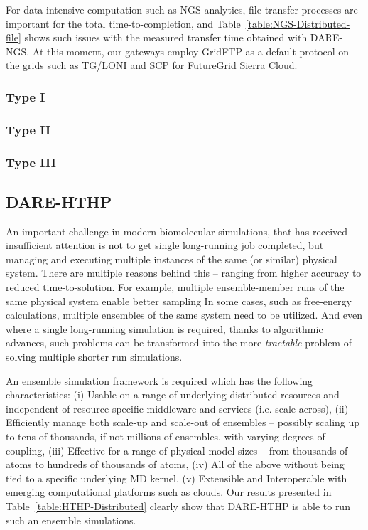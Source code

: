 \documentclass[]{article}
\begin{document}
For data-intensive computation such as NGS analytics, file transfer
processes are important for the total time-to-completion, and
Table~\ref{table:NGS-Distributed-file} shows such issues with the
measured transfer time obtained with DARE-NGS.  At this moment, our
gateways employ GridFTP as a default protocol on the grids such as
TG/LONI and SCP for FutureGrid Sierra Cloud.


\subsubsection{Type I} 

\subsubsection{Type II} 

\subsubsection{Type III} 


\subsection{DARE-HTHP}

An important challenge in modern biomolecular simulations, that has
received insufficient attention is not to get single long-running job
completed, but managing and executing multiple instances of the same
(or similar) physical system.  There are multiple reasons behind this
-- ranging from higher accuracy to reduced time-to-solution. For
example, multiple ensemble-member runs of the same physical system
enable better sampling In some cases, such as free-energy
calculations, multiple ensembles of the same system need to be
utilized. And even where a single long-running simulation is required,
thanks to algorithmic advances, such problems can be transformed into
the more {\it tractable} problem of solving multiple shorter run
simulations.



An ensemble simulation framework is required which has the following
characteristics: (i) Usable on a range of underlying distributed
resources and independent of resource-specific
middleware and services (i.e. scale-across), (ii) Efficiently manage
both scale-up and scale-out of ensembles -- possibly scaling up to
tens-of-thousands, if not millions of ensembles, with varying degrees
of coupling, (iii) Effective for a range of physical model sizes --
from thousands of atoms to hundreds of thousands of atoms, (iv) All of
the above without being tied to a specific underlying MD kernel, (v)
Extensible and Interoperable with emerging computational platforms
such as clouds.  Our results presented in
Table~\ref{table:HTHP-Distributed} clearly show that DARE-HTHP is able
to run such an ensemble simulations.
\end{document}
